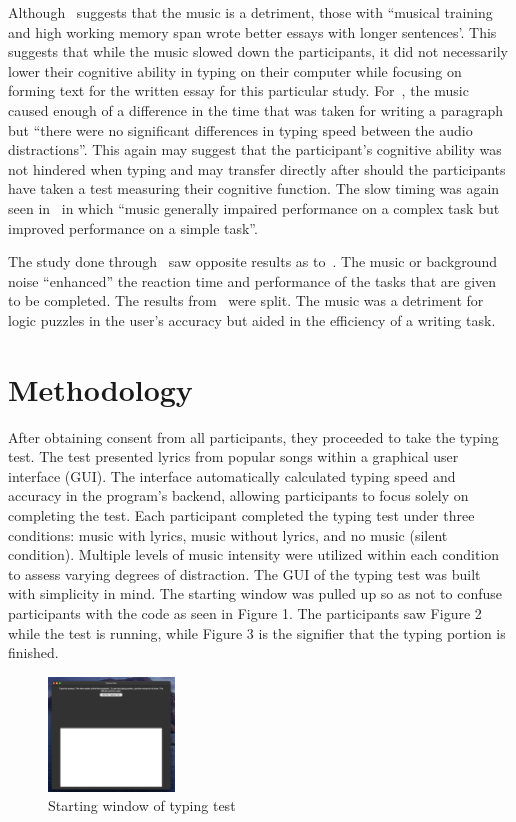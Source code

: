 \documentclass[manuscript, screen, review]{acmart} %
\begin{document}
Although~\cite{ransdell2001141} suggests that the music is a detriment, those with ``musical training and high working memory span wrote better essays with longer sentences'. This suggests that while the music slowed down the participants, it did not necessarily lower their cognitive ability in typing on their computer while focusing on forming text for the written essay for this particular study. For~\cite{AudioDistractionsAshley}, the music caused enough of a difference in the time that was taken for writing a paragraph but ``there were no significant differences in typing speed between the audio distractions''. This again may suggest that the participant's cognitive ability was not hindered when typing and may transfer directly after should the participants have taken a test measuring their cognitive function. The slow timing was again seen in~\cite{Gonzalez_Aiello_2019} in which ``music generally impaired performance on a complex task but improved performance on a simple task''. 

The study done through~\cite{kiss2021effect} saw opposite results as to~\cite{Gonzalez_Aiello_2019}. The music or background noise ``enhanced'' the reaction time and performance of the tasks that are given to be completed. The results from~\cite{mathew2022inherently} were split. The music was a detriment for logic puzzles in the user's accuracy but aided in the efficiency of a writing task. 

\section{Methodology}
After obtaining consent from all participants, they proceeded to take the typing test. The test presented lyrics from popular songs within a graphical user interface (GUI). 
The interface automatically calculated typing speed and accuracy in the program's backend, allowing participants to focus solely on completing the test.
Each participant completed the typing test under three conditions: music with lyrics, music without lyrics, and no music (silent condition).
Multiple levels of music intensity were utilized within each condition to assess varying degrees of distraction.
The GUI of the typing test was built with simplicity in mind. The starting window was pulled up so as not to confuse participants with the code as seen in Figure 1. The participants saw Figure 2 while the test is running, while Figure 3 is the signifier that the typing portion is finished. 

\begin{figure}
  \includegraphics[width=0.3\textwidth]{typing_test_1}
  \caption{Starting window of typing test}
\end{figure}
\end{document}
